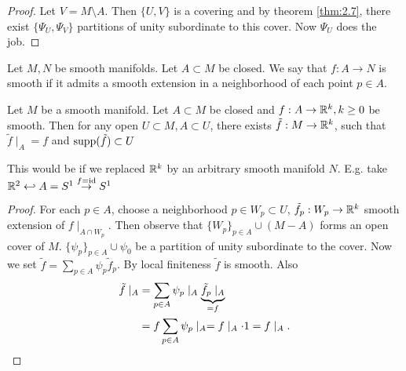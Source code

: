 \begin{proof}
    Let \(V=M\setminus A\). Then \(\{U,V\}\) is a covering and  by theorem \ref{thm:2.7}, there exist 
    \(\{\Psi_U,\Psi_V\}\) partitions of unity subordinate to this cover. Now \(\Psi_U\) does the job.
\end{proof}

\begin{definition*}
    Let \(M,N\) be smooth manifolds. Let \(A\subset M\) be closed. We say that \(f:A\to N\) is smooth 
    if it admits a smooth extension in a neighborhood of each point \(p\in A\). 
\end{definition*}

\begin{proposition}\label{prop:2.9}
    Let \(M\) be a smooth manifold. Let \(A\subset M\) be closed and \(f:A\to\mathbb{R}^k, k\geq 0\) be smooth.
    Then for any open \(U \subset M, A\subset U\), there exists \(\tilde{f}:M\to\mathbb{R}^k\), such that \(\tilde{f}\mid_{A}=f\) and \(\text{supp}(\tilde{f})\subset U\)
\end{proposition}

\begin{remark}
    This would be  if we replaced \(\mathbb{R}^k\) by an arbitrary smooth manifold \(N\). E.g. 
    take \(\mathbb{R}^2\hookleftarrow A=S^1\stackrel{f=\text{id}}{\to}S^1\)
\end{remark}

\begin{proof} %
    For each \(p\in A\), choose a neighborhood \(p\in W_p\subset U\), \(\tilde{f}_p:W_p\to\mathbb{R}^k\) smooth 
    extension of \(f\mid_{A\cap W_p}\). Then observe that \(\{W_p\}_{p\in A}\cup (M-A)\) forms an open cover of \(M\).
    \(\{\psi_p\}_{p\in A}\cup \psi_0\) be a partition of unity subordinate to the cover. Now we set 
    \(\tilde{f}=\sum_{p\in A}\psi_p \tilde{f}_p\). By local finiteness \(\tilde{f}\) is smooth. Also 
    \begin{align*}
        \tilde{f}\mid_A&=\sum_{p\in A} \psi_p\mid_A \underbrace{\tilde{f_p}\mid_A}_{=f}\\
        &=f\sum_{p\in A} \psi_p\mid_A = f\mid_A \cdot 1 = f\mid_A .\qedhere
    \end{align*}
\end{proof}

